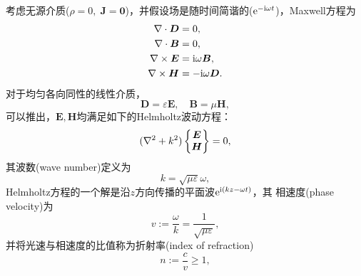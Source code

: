 考虑无源介质($\rho=0,\;\bm J=\bm 0$)，并假设场是随时间简谐的($\mathop{}\!\mathrm{e}^{-\mathrm{i}\omega t}$)，Maxwell方程为
\begin{subequations}
    \begin{align}
        \nabla\cdot\bm D&=0,\\
        \nabla\cdot\bm B&=0,\\
        \nabla\times\bm E&=\mathrm{i}\omega\bm B,\\
        \nabla\times\bm H&=-\mathrm{i}\omega\bm D. 
    \end{align}
\end{subequations}
对于均匀各向同性的线性介质，
\[
    \bm D=\varepsilon\bm E,\quad\bm B=\mu\bm H,
\]
可以推出，$\bm E,\bm H$均满足如下的Helmholtz波动方程：
\begin{equation}
    (\nabla^2+k^2)\begin{Bmatrix}
        \bm E\\\bm H
    \end{Bmatrix}=0,
\end{equation}
其波数(wave number)定义为
\begin{equation}
    k=\sqrt{\mu\varepsilon}\omega,
\end{equation}
Helmholtz方程的一个解是沿$z$方向传播的平面波$\mathop{}\!\mathrm{e}^{\mathrm{i}(kz-\omega t)}$，其
相速度(phase velocity)为
\begin{equation}
    v:=\frac{\omega}k=\frac1{\sqrt{\mu\varepsilon}},
\end{equation}
并将光速与相速度的比值称为折射率(index of refraction)
\begin{equation}
    n:=\frac cv\geqslant1,
\end{equation}
